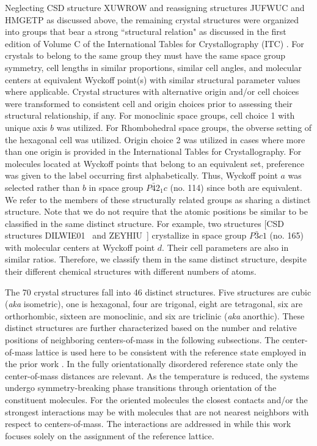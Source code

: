 \documentclass[preprint]{iucr}              %
\begin{document}
Neglecting CSD structure XUWROW and reassigning structures JUFWUC and HMGETP as discussed above, the remaining crystal structures were organized into groups that bear a strong ``structural relation" as discussed in the first edition of Volume C of the International Tables for Crystallography (ITC) \cite{Hahn83}. For crystals to belong to the same group they must have the same space group symmetry, cell lengths in similar proportions, similar cell angles, and molecular centers at equivalent Wyckoff point(s) with similar structural parameter values where applicable.  Crystal structures with alternative origin and/or cell choices were transformed to consistent cell and origin choices prior to assessing their structural relationship, if any.  For monoclinic space groups, cell choice 1 with unique axis $b$ was utilized.  For Rhombohedral space groups, the obverse setting of the hexagonal cell was utilized.  Origin choice 2 was utilized in cases where more than one origin is provided in the International Tables for Crystallography.  For molecules located at Wyckoff points that belong to an equivalent set, preference was given to the label occurring first alphabetically.  Thus, Wyckoff point $a$ was selected rather than $b$ in space group $P\bar{4}2_1c$ (no. 114) since both are equivalent.  We refer to the members of these structurally related groups as sharing a distinct structure. Note that we do not require that the atomic positions be similar to be classified in the same distinct structure. For example, two structures [CSD structures DILWIE01~\cite{Ebert98} and ZEYHIU~\cite{Noth95}] crystallize in space group $P\bar{3}c1$ (no. 165) with molecular centers at Wyckoff point $d$. Their cell parameters are also in similar ratios. Therefore, we classify them in the same distinct structure, despite their different chemical structures with different numbers of atoms.

The 70 crystal structures fall into 46 distinct structures. Five structures are cubic (\textit{aka} isometric), one is hexagonal, four are trigonal, eight are tetragonal, six are orthorhombic, sixteen are monoclinic, and six are triclinic (\textit{aka} anorthic).  These distinct structures are further characterized based on the number and relative positions of neighboring centers-of-mass in the following subsections.  The center-of-mass lattice is used here to be consistent with the reference state employed in the prior work \cite{Keith04c,Mettes04}.  In the fully orientationally disordered reference state only the center-of-mass distances are relevant.  As the temperature is reduced, the systems undergo symmetry-breaking phase transitions through orientation of the constituent molecules.  For the oriented molecules the closest contacts and/or the strongest interactions may be with molecules that are not nearest neighbors with respect to centers-of-mass.  The interactions are addressed in \cite{Keith04c,Mettes04} while this work focuses solely on the assignment of the reference lattice.
\end{document}
